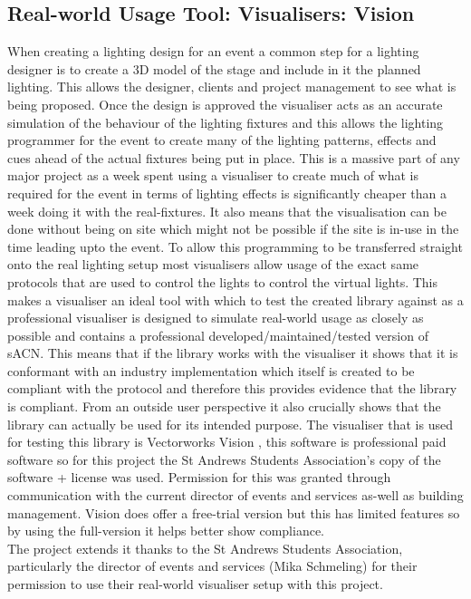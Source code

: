 \documentclass[11pt,a4paper]{report}
\begin{document}
\subsection{Real-world Usage Tool: Visualisers: Vision}
When creating a lighting design for an event a common step for a lighting designer is to create a 3D model of the stage and include in it the planned lighting. This allows the designer, clients and project management to see what is being proposed. Once the design is approved the visualiser acts as an accurate simulation of the behaviour of the lighting fixtures and this allows the lighting programmer for the event to create many of the lighting patterns, effects and cues ahead of the actual fixtures being put in place. This is a massive part of any major project as a week spent using a visualiser to create much of what is required for the event in terms of lighting effects is significantly cheaper than a week doing it with the real-fixtures. It also means that the visualisation can be done without being on site which might not be possible if the site is in-use in the time leading upto the event. To allow this programming to be transferred straight onto the real lighting setup most visualisers allow usage of the exact same protocols that are used to control the lights to control the virtual lights. This makes a visualiser an ideal tool with which to test the created library against as a professional visualiser is designed to simulate real-world usage as closely as possible and contains a professional developed/maintained/tested version of sACN. This means that if the library works with the visualiser it shows that it is conformant with an industry implementation which itself is created to be compliant with the protocol and therefore this provides evidence that the library is compliant. From an outside user perspective it also crucially shows that the library can actually be used for its intended purpose. The visualiser that is used for testing this library is Vectorworks Vision \cite{VISION}, this software is professional paid software so for this project the St Andrews Students Association's copy of the software + license was used. Permission for this was granted through communication with the current director of events and services as-well as building management. Vision does offer a free-trial version but this has limited features so by using the full-version it helps better show compliance. \\

The project extends it thanks to the St Andrews Students Association, particularly the director of events and services (Mika Schmeling) for their permission to use their real-world visualiser setup with this project.
\end{document}
